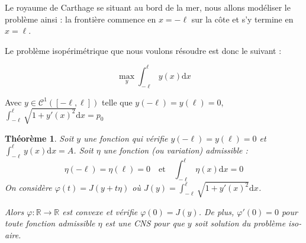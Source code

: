\documentclass[10pt,a4paper]{article}
\newcommand{\R}{\mathbb{R}}
\newcommand{\C}{\mathcal{C}}
\renewcommand{\d}{\mathrm{d}}
\renewcommand{\phi}{\varphi}
\theoremstyle{plain}
\newtheorem{thm}{Théorème}[section]
\theoremstyle{definition}
\begin{document}
Le royaume de Carthage se situant au bord de la mer, nous allons modéliser le problème ainsi : la frontière commence en $x=-\ell$ sur la côte et s'y termine en $x=\ell$.

\begin{center}


\end{center}



Le problème isopérimétrique que nous voulons résoudre est donc le suivant :

\[\max_{y}\int_{-\ell}^\ell y(x)\d x\]

Avec $y\in\C^1([-\ell,\ell])$ telle que $y(-\ell)=y(\ell)=0$, $\int_{-\ell}^\ell\sqrt{1+y'(x)^2}\d x=p_0$





\begin{thm}
Soit $y$ une fonction qui vérifie $y(-\ell)=y(\ell)=0$ et $\displaystyle\int_{-\ell}^{\ell}y(x)\d x=A$. Soit $\eta$ une fonction (ou \emph{variation}) \emph{admissible} :
\[\eta(-\ell)=\eta(\ell)=0\quad \text{et}\quad\int_{-\ell}^{\ell}\eta(x)\d x=0\]
On considère $\phi(t)=J(y+t\eta)$ où $J(y)=\displaystyle\int_{-\ell}^{\ell}\sqrt{1+y'(x)^2}\d x$.

Alors $\phi\colon\R\to\R$ est convexe et vérifie $\phi(0)=J(y)$. De plus, $\phi'(0)=0$ pour toute fonction admissible $\eta$ est une CNS pour que $y$ soit solution du problème iso-aire.
\end{thm}
\end{document}
